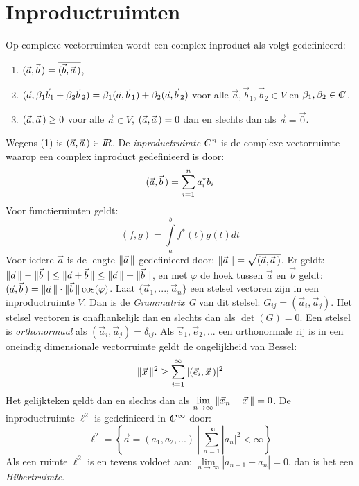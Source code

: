 \documentclass[twoside]{report}
\begin{document}
\section{Inproductruimten}
Op complexe vectorruimten wordt een complex inproduct als volgt gedefinieerd:
\begin{enumerate}
\item $(\vec{a},\vec{b}\,)=\overline{(\vec{b},\vec{a}\,)}$,
\item $(\vec{a},\beta_1\vec{b}_1+\beta_2\vec{b}\,_2)=\beta_1(\vec{a},\vec{b}\,_1)+\beta_2(\vec{a},\vec{b}\,_2)$
      voor alle $\vec{a},\vec{b}_1,\vec{b}_2\in V$ en $\beta_1,\beta_2\in\CC$.
\item $(\vec{a},\vec{a}\,)\geq0$ voor alle $\vec{a}\in V$,
      $(\vec{a},\vec{a}\,)=0$ dan en slechts dan als $\vec{a}=\vec{0}$.
\end{enumerate}
Wegens (1) is $(\vec{a},\vec{a}\,)\in I\hspace{-1mm}R$. De {\it inproductruimte} $\CC^n$ is
de complexe vectorruimte waarop een complex inproduct gedefinieerd is door:
\[
(\vec{a},\vec{b}\,)=\sum_{i=1}^na_i^*b_i
\]
Voor functieruimten geldt:
\[
(f,g)=\int\limits_a^bf^*(t)g(t)dt
\]
Voor iedere $\vec{a}$ is de lengte $\|\vec{a}\,\|$ gedefinieerd door:
$\|\vec{a}\,\|=\sqrt{(\vec{a},\vec{a}\,)}$. Er geldt:
$\|\vec{a}\,\|-\|\vec{b}\,\|\leq\|\vec{a}+\vec{b}\,\|\leq\|\vec{a}\,\|+\|\vec{b}\,\|$,
en met $\varphi$ de hoek tussen $\vec{a}$ en $\vec{b}$ geldt:
$(\vec{a},\vec{b}\,)=\|\vec{a}\,\|\cdot\|\vec{b}\,\|\cos(\varphi)$.
\npar
Laat $\{\vec{a}_1,...,\vec{a}_n\}$ een stelsel vectoren zijn in een inproductruimte
$V$. Dan is de {\it Grammatrix G} van dit stelsel: $G_{ij}=(\vec{a}_i,\vec{a}_j)$.
Het stelsel vectoren is onafhankelijk dan en slechts dan als $\det(G)=0$.
\npar
Een stelsel is {\it orthonormaal} als $(\vec{a}_i,\vec{a}_j)=\delta_{ij}$.
Als $\vec{e}_1,\vec{e}_2,...$ een orthonormale rij is in een oneindig
dimensionale vectorruimte geldt de ongelijkheid van Bessel:
\[
\|\vec{x}\,\|^2\geq\sum_{i=1}^\infty|(\vec{e}_i,\vec{x}\,)|^2
\]
Het gelijkteken geldt dan en slechts dan als
$\lim\limits_{n\rightarrow\infty}\|\vec{x}_n-\vec{x}\,\|=0$.
\npar
De inproductruimte $\ell^2$ is gedefinieerd in $\CC^\infty$ door:
\[
\ell^2=\left\{\vec{a}=(a_1,a_2,...)~|~\sum_{n=1}^\infty|a_n|^2<\infty\right\}
\]
Als een ruimte $\ell^2$ is en tevens voldoet aan:
$\lim\limits_{n\rightarrow\infty}|a_{n+1}-a_n|=0$,
dan is het een {\it Hilbertruimte}.
\end{document}
